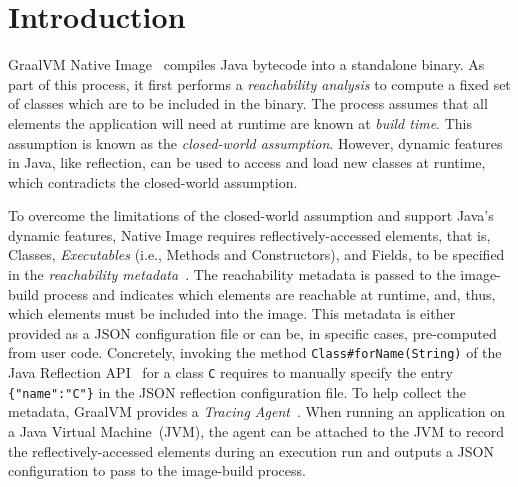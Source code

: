 \chapter{Introduction}


GraalVM Native Image~\cite{noauthor_native_nodate} compiles Java bytecode into a standalone binary. As part of this process, it first performs a \emph{reachability analysis} to compute a fixed set of classes which are to be included in the binary. 
The process assumes that all elements the application will need at runtime are known at \emph{build time}. This assumption is known as the \emph{closed-world assumption}.
However, dynamic features in Java, like reflection, can be used to access and load new classes at runtime, which contradicts the closed-world assumption. 

To overcome the limitations of the closed-world assumption and support Java's dynamic features, Native Image requires reflectively-accessed elements, that is, Classes, \emph{Executables} (i.e., Methods and Constructors), and Fields, to be specified in the \emph{reachability metadata}~\cite{noauthor_reachability_nodate}. The reachability metadata is passed to the image-build process and indicates which elements are reachable at runtime, and, thus, which elements must be included into the image. This metadata is either provided as a JSON configuration file or can be, in specific cases, pre-computed from user code. Concretely, invoking the method  \verb|Class#forName(String)| of the Java Reflection API~\cite{noauthor_core_nodate} for a class \verb|C| requires to manually specify the entry \verb|{"name":"C"}| in the JSON reflection configuration file.
To help collect the metadata, GraalVM provides a \emph{Tracing Agent}~\cite{noauthor_collect_nodate}. When running an application on a Java Virtual Machine~(JVM), the agent can be attached to the JVM to record the reflectively-accessed elements during an execution run and outputs a JSON configuration to pass to the image-build process.

